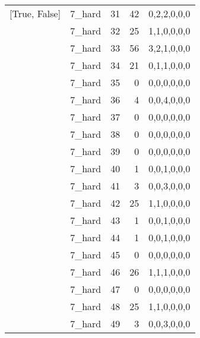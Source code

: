 \begin{tabular}{llrrl}
 [True, False]   & 7\_hard              &            31 &                    42 & 0,2,2,0,0,0   \\
 [True, False]   & 7\_hard              &            32 &                    25 & 1,1,0,0,0,0   \\
 [True, False]   & 7\_hard              &            33 &                    56 & 3,2,1,0,0,0   \\
 [True, False]   & 7\_hard              &            34 &                    21 & 0,1,1,0,0,0   \\
 [True, False]   & 7\_hard              &            35 &                     0 & 0,0,0,0,0,0   \\
 [True, False]   & 7\_hard              &            36 &                     4 & 0,0,4,0,0,0   \\
 [True, False]   & 7\_hard              &            37 &                     0 & 0,0,0,0,0,0   \\
 [True, False]   & 7\_hard              &            38 &                     0 & 0,0,0,0,0,0   \\
 [True, False]   & 7\_hard              &            39 &                     0 & 0,0,0,0,0,0   \\
 [True, False]   & 7\_hard              &            40 &                     1 & 0,0,1,0,0,0   \\
 [True, False]   & 7\_hard              &            41 &                     3 & 0,0,3,0,0,0   \\
 [True, False]   & 7\_hard              &            42 &                    25 & 1,1,0,0,0,0   \\
 [True, False]   & 7\_hard              &            43 &                     1 & 0,0,1,0,0,0   \\
 [True, False]   & 7\_hard              &            44 &                     1 & 0,0,1,0,0,0   \\
 [True, False]   & 7\_hard              &            45 &                     0 & 0,0,0,0,0,0   \\
 [True, False]   & 7\_hard              &            46 &                    26 & 1,1,1,0,0,0   \\
 [True, False]   & 7\_hard              &            47 &                     0 & 0,0,0,0,0,0   \\
 [True, False]   & 7\_hard              &            48 &                    25 & 1,1,0,0,0,0   \\
 [True, False]   & 7\_hard              &            49 &                     3 & 0,0,3,0,0,0   \\

\end{tabular}
